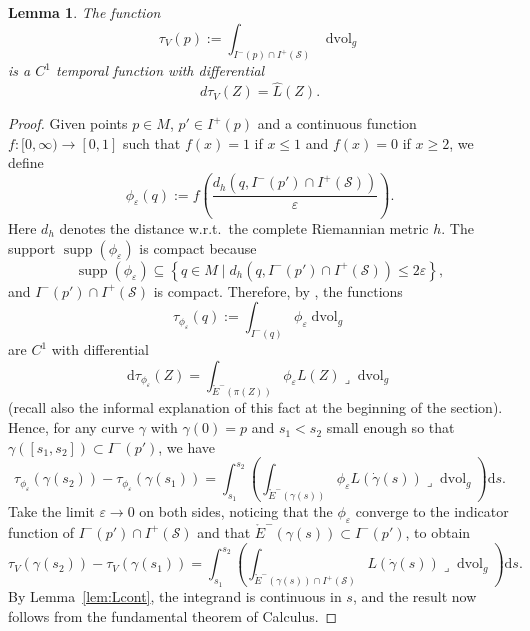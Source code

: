\documentclass[a4paper,11pt]{amsart}
\newtheorem{lemma}[theorem]{{Lemma}}%
\newcommand{\vol}{\operatorname{dvol}_g}
\newcommand{\CS}{\mathcal{S}}
\newcommand{\df}{\mathrm{d}}
\begin{document}
\begin{lemma}
 The function
 \begin{equation*}
     \tau_V (p) := \int_{I^-(p) \cap I^+(\CS)} \vol
 \end{equation*}
 is a $C^1$ temporal function with differential
 \begin{equation*}
     d \tau_V(Z) = \hat L (Z).
 \end{equation*}
\end{lemma}

\begin{proof}
 Given points $p \in M$, $p' \in I^+(p)$ and a continuous function $f \colon [0,\infty) \to [0,1]$ such that $f(x) = 1$ if $x\leq 1$ and $f(x) = 0$ if $x \geq 2$, we define
 \begin{equation*}
     \phi_\varepsilon(q) := f\left(\frac{d_h\left(q,I^-(p') \cap I^+(\CS)\right)}{\varepsilon}\right).
 \end{equation*}
 Here $d_h$ denotes the distance w.r.t.\ the complete Riemannian metric $h$. The support $\operatorname{supp}(\phi_\varepsilon)$ is compact because
 \begin{equation*}
     \operatorname{supp}(\phi_\varepsilon) \subseteq \left\{ q \in M \mid d_h\left(q,I^-(p') \cap I^+(\CS)\right) \leq 2\varepsilon \right\},
 \end{equation*}
 and $I^-(p') \cap I^+(\CS)$ is compact. Therefore, by \cite[Lem.~3.1]{CGM16}, the functions
    \begin{equation*}
     \tau_{\phi_\varepsilon} (q) := \int_{I^-(q)} {\phi_\varepsilon} \vol
 \end{equation*}
 are $C^1$ with differential
 \begin{equation*}
     \df \tau_{\phi_\varepsilon}(Z) = \int_{\mathring E^-(\pi(Z))} \phi_\varepsilon L(Z) \lrcorner \vol
 \end{equation*}
 (recall also the informal explanation of this fact at the beginning of the section). Hence, for any curve $\gamma$ with $\gamma(0) = p$ and $s_1 < s_2$ small enough so that $\gamma([s_1,s_2]) \subset I^-(p')$, we have
 \begin{equation*}
     \tau_{\phi_\varepsilon} (\gamma(s_2)) - \tau_{\phi_\varepsilon} (\gamma(s_1)) = \int_{s_1}^{s_2} \left( \int_{\mathring E^-(\gamma(s))} \phi_\varepsilon L(\dot \gamma(s)) \lrcorner \vol \right)\df s.
 \end{equation*}
 Take the limit $\varepsilon \to 0$ on both sides, noticing that the $\phi_\varepsilon$ converge to the indicator function of $I^-(p') \cap I^+(\CS)$ and that $\mathring E^-(\gamma(s)) \subset I^-(p')$, to obtain
 \begin{equation} \label{eq:difference}
     \tau_V (\gamma(s_2)) - \tau_V (\gamma(s_1)) = \int_{s_1}^{s_2} \left( \int_{\mathring E^-(\gamma(s)) \cap I^+(\CS)} L(\dot \gamma(s)) \lrcorner \vol \right) \df s.
 \end{equation}
 By Lemma~\ref{lem:Lcont}, the integrand is continuous in $s$, and the result now follows from the fundamental theorem of Calculus.
 

\end{proof}
\end{document}
